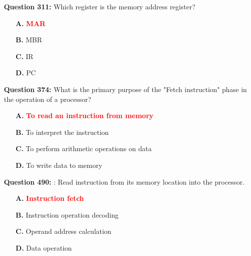 \documentclass[12pt,a4paper]{article}
\begin{document}
\vspace{0.5cm}

\vspace{0.5cm}

\vspace{0.5cm}

\vspace{0.5cm}

\textbf{Question 311:} Which register is the memory address register?

\begin{itemize}
    \item[\textbf{A.}] \textcolor{red}{\textbf{MAR}}
    \item[\textbf{B.}] MBR
    \item[\textbf{C.}] IR
    \item[\textbf{D.}] PC
\end{itemize}

\vspace{0.5cm}

\vspace{0.5cm}

\textbf{Question 374:} What is the primary purpose of the "Fetch instruction" phase in the operation of a processor?

\begin{itemize}
    \item[\textbf{A.}] \textcolor{red}{\textbf{To read an instruction from memory}}
    \item[\textbf{B.}] To interpret the instruction
    \item[\textbf{C.}] To perform arithmetic operations on data
    \item[\textbf{D.}] To write data to memory
\end{itemize}

\vspace{0.5cm}

\vspace{0.5cm}

\vspace{0.5cm}

\vspace{0.5cm}

\textbf{Question 490:} \underline{\hspace{1.5cm}}: Read instruction from its memory location into the processor.

\begin{itemize}
    \item[\textbf{A.}] \textcolor{red}{\textbf{Instruction fetch}}
    \item[\textbf{B.}] Instruction operation decoding
    \item[\textbf{C.}] Operand address calculation
    \item[\textbf{D.}] Data operation
\end{itemize}
\end{document}
